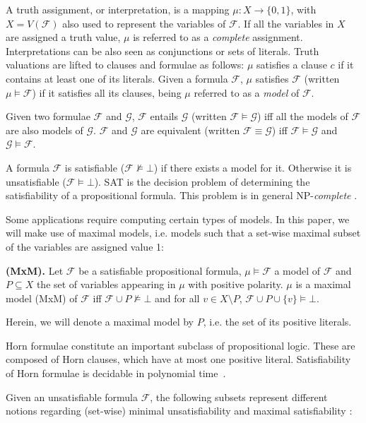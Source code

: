 \documentclass{llncs}
\newcommand{\fml}[1]{{\mathcal{#1}}}
\newcommand{\set}[1]{\{ #1 \}}
\DeclareMathOperator*{\nentails}{\nvDash}
\DeclareMathOperator*{\entails}{\vDash}
\begin{document}
A truth assignment, or interpretation, is a mapping $\mu : X
\rightarrow \set{0,1}$, with $X=V(\fml{F})$ also used to represent the
variables of $\fml{F}$.
If all the variables in $X$ are assigned a truth value, $\mu$ is referred to as a \textit{complete} assignment. Interpretations can be also seen as conjunctions or sets of literals. Truth valuations are lifted to clauses and formulae as follows: $\mu$ satisfies a clause $c$ if it contains at least one of its literals. 
Given a formula $\fml{F}$, $\mu$ satisfies $\fml{F}$ (written $\mu \entails \fml{F}$) if it satisfies all its clauses, being $\mu$ referred to as a \textit{model} of $\fml{F}$.

Given two formulae $\fml{F}$ and $\fml{G}$, $\fml{F}$ entails $\fml{G}$ (written $\fml{F} \entails \fml{G}$) iff all the models of $\fml{F}$ are also models of $\fml{G}$. $\fml{F}$ and $\fml{G}$ are equivalent (written $\fml{F} \equiv \fml{G}$) iff $\fml{F} \entails \fml{G}$ and $\fml{G} \entails \fml{F}$. 

A formula $\fml{F}$ is satisfiable ($\fml{F} \nentails \bot$) if there exists a model for it. Otherwise it is unsatisfiable ($\fml{F} \entails \bot$). SAT is the decision problem of determining the satisfiability of a propositional formula. This problem is in general NP-\textit{complete} \cite{cook-stoc71}.

Some applications require computing certain types of models. In this paper, we will make use of maximal models, i.e. models such that a set-wise maximal subset of the variables are assigned value 1:

\begin{definition}\label{mxm}
\textbf{(MxM). } Let $\fml{F}$ be a satisfiable propositional formula, $\mu \entails \fml{F}$ a model of $\fml{F}$ and $P \subseteq X$ the set of variables appearing in $\mu$ with positive polarity. $\mu$ is a maximal model (MxM) of $\fml{F}$ iff $\fml{F} \cup P \nentails \bot$ and for all $v \in X \setminus P$, $\fml{F} \cup P \cup \{v\} \entails \bot$. 
\end{definition}

Herein, we will denote a maximal model by $P$, i.e. the set of its positive literals.


Horn formulae constitute an important subclass of propositional logic. These are composed of Horn clauses, which have at most one positive literal. Satisfiability of Horn formulae is decidable in polynomial time~\cite{gallier-jlp84,itai-jlp87,minoux-ipl88}.


Given an unsatisfiable formula $\fml{F}$, the following subsets represent different notions regarding (set-wise) minimal unsatisfiability and maximal satisfiability \cite{liffiton-jar08,mshjpb-ijcai13}:
\end{document}
